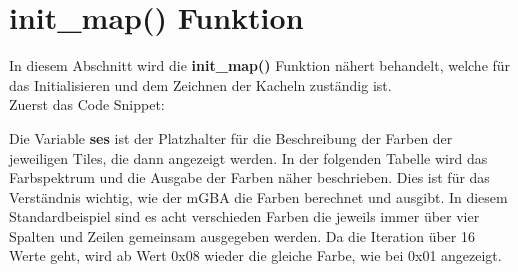 \newpage
\section{init\_map() Funktion}
In diesem Abschnitt wird die \textbf{init\_map()} Funktion nähert behandelt, welche für das Initialisieren und dem Zeichnen der Kacheln zuständig ist. \\
Zuerst das Code Snippet:



Die Variable \textbf{ses} ist der Platzhalter für die Beschreibung der Farben der jeweiligen Tiles, die dann angezeigt werden. In der folgenden Tabelle wird das Farbspektrum und die Ausgabe der Farben näher beschrieben. Dies ist für das Verständnis wichtig, wie der mGBA die Farben berechnet und ausgibt. In diesem Standardbeispiel sind es acht verschieden Farben die jeweils immer über vier Spalten und Zeilen gemeinsam ausgegeben werden. Da die Iteration über 16 Werte geht, wird ab Wert 0x08 wieder die gleiche Farbe, wie bei 0x01 angezeigt.

